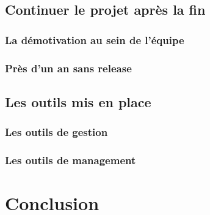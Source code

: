 \documentclass{article}
\begin{document}
\subsection{Continuer le projet après la fin}
\subsubsection{La démotivation au sein de l'équipe}
\subsubsection{Près d'un an sans release}
\subsection{Les outils mis en place}
\subsubsection{Les outils de gestion}
\subsubsection{Les outils de management}

\section{Conclusion}
\end{document}
